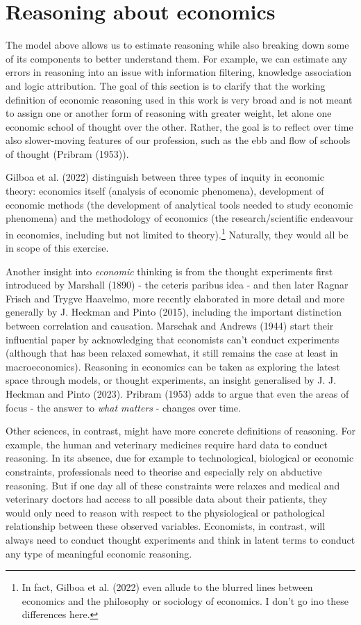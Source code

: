 \documentclass[
]{article}
\theoremstyle{plain}
\theoremstyle{definition}
\theoremstyle{remark}
\begin{document}
\section{Reasoning about economics}\label{reasoning-about-economics}

The model above allows us to estimate reasoning while also breaking down
some of its components to better understand them. For example, we can
estimate any errors in reasoning into an issue with information
filtering, knowledge association and logic attribution. The goal of this
section is to clarify that the working definition of economic reasoning
used in this work is very broad and is not meant to assign one or
another form of reasoning with greater weight, let alone one economic
school of thought over the other. Rather, the goal is to reflect over
time also slower-moving features of our profession, such as the ebb and
flow of schools of thought (Pribram (1953)).

Gilboa et al. (2022) distinguish between three types of inquity in
economic theory: economics itself (analysis of economic phenomena),
development of economic methods (the development of analytical tools
needed to study economic phenomena) and the methodology of economics
(the research/scientific endeavour in economics, including but not
limited to theory).\footnote{In fact, Gilboa et al. (2022) even allude
  to the blurred lines between economics and the philosophy or sociology
  of economics. I don't go ino these differences here.} Naturally, they
would all be in scope of this exercise.

Another insight into \emph{economic} thinking is from the thought
experiments first introduced by Marshall (1890) - the ceteris paribus
idea - and then later Ragnar Frisch and Trygve Haavelmo, more recently
elaborated in more detail and more generally by J. Heckman and Pinto
(2015), including the important distinction between correlation and
causation. Marschak and Andrews (1944) start their influential paper by
acknowledging that economists can't conduct experiments (although that
has been relaxed somewhat, it still remains the case at least in
macroeconomics). Reasoning in economics can be taken as exploring the
latest space through models, or thought experiments, an insight
generalised by J. J. Heckman and Pinto (2023). Pribram (1953) adds to
argue that even the areas of focus - the answer to \emph{what matters} -
changes over time.

Other sciences, in contrast, might have more concrete definitions of
reasoning. For example, the human and veterinary medicines require hard
data to conduct reasoning. In its absence, due for example to
technological, biological or economic constraints, professionals need to
theorise and especially rely on abductive reasoning. But if one day all
of these constraints were relaxes and medical and veterinary doctors had
access to all possible data about their patients, they would only need
to reason with respect to the physiological or pathological relationship
between these observed variables. Economists, in contrast, will always
need to conduct thought experiments and think in latent terms to conduct
any type of meaningful economic reasoning.
\end{document}
